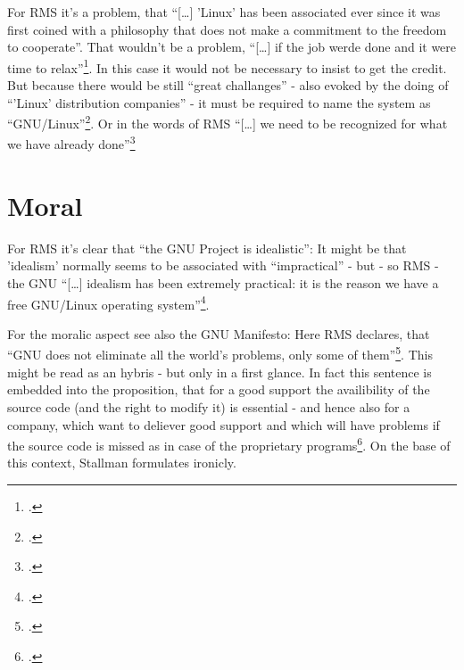 \documentclass[DIV=calc,BCOR=5mm,11pt,headings=small,oneside,abstract=true, toc=bib]{scrartcl}
\begin{document}
For RMS it's a problem, that \enquote{[\ldots] 'Linux' has been associated
ever since it was first coined with a philosophy that does not make a
commitment to the freedom to cooperate}.
That wouldn't be a problem, \enquote{[\ldots]
if the job werde done and it were time
to relax}\footcite[cf][51]{Stallman2000a}. In this case it would not be
necessary to insist to get the credit. But because there would be still
\enquote{great challanges} - also evoked by the doing of
\enquote{'Linux' distribution companies} - it must be required to name the
system as \enquote{GNU/Linux}\footcite[cf][51]{Stallman2000a}. Or in the
words of RMS \enquote{[\ldots] we need to be recognized for what we have
already done}\footcite[cf][53]{Stallman2000a}

\section{Moral}

For RMS it's clear that \enquote{the GNU Project is idealistic}: It might be
that 'idealism' normally seems to be associated with \enquote{impractical} -
but - so RMS - the GNU \enquote{[\ldots] idealism has been extremely
practical: it is the reason we have a free GNU/Linux operating
system}\footcite[cf][53]{Stallman2000a}.

For the moralic aspect see also the GNU Manifesto: Here RMS declares, that
\enquote{GNU does not eliminate all the world's problems, only some of
them}\footcite[cf][35]{Stallman1984a}. This might be read as an hybris -
but only in a first glance. In fact this sentence is embedded into the
proposition, that for a good support the availibility of the source code
(and the right to modify it) is essential - and hence also for a company, which
want to deliever good support and which will have problems if the source code is
missed as in case of the proprietary programs\footcite[cf][35]{Stallman1984a}.
On the base of this context, Stallman formulates ironicly.

\small

\end{document}
